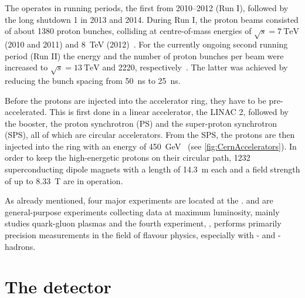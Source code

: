 The \lhc operates in running periods, the first from \numrange{2010}{2012} (Run I), followed by the long shutdown 1 in \num{2013} and \num{2014}.
During Run I, the proton beams consisted of about \num{1380} proton bunches, colliding at centre-of-mass energies of $\sqrt{s}=\SI{7}{\tera\electronvolt}$ (\num{2010} and \num{2011}) and \SI{8}{\tera\electronvolt} (\num{2012})~\cite{LHC_statistic}.
For the currently ongoing second running period (Run II) the energy and the number of proton bunches per beam were increased to $\sqrt{s}=\SI{13}{\tera\electronvolt}$ and \num{2220}, respectively~\cite{LHC_statistic}.
The latter was achieved by reducing the bunch spacing from \SI{50}{\nano\second} to \SI{25}{\nano\second}.

Before the protons are injected into the \lhc accelerator ring, they have to be pre-accelerated.
This is first done in a linear accelerator, the LINAC 2, followed by the booster, the proton synchrotron (PS) and the super-proton synchrotron (SPS), all of which are circular accelerators.
From the SPS, the protons are then injected into the \lhc ring with an energy of \SI{450}{\giga\electronvolt}~\cite{Bruening:782076} (see \cref{fig:CernAccelerators}).
In order to keep the high-energetic protons on their circular path, \num{1232} superconducting dipole magnets with a length of \SI{14.3}{\metre} each and a field strength of up to \SI{8.33}{\tesla} are in operation.

As already mentioned, four major experiments are located at the \lhc.
\atlas and \cms are general-purpose experiments collecting data at maximum luminosity, \alice mainly studies quark-gluon plasmas and the fourth experiment, \lhcb, performs primarily precision measurements in the field of flavour physics, especially with \bquark- and \cquark-hadrons.

\section{The \lhcb detector}

